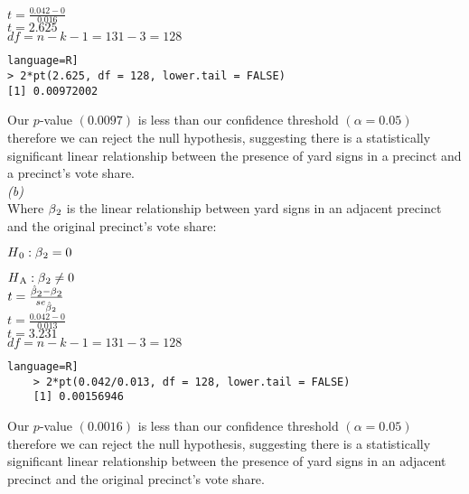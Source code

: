 \documentclass[12pt,letterpaper]{article}
\begin{document}
\noindent$t = \frac{0.042-0}{0.016}$\\

\noindent$t = 2.625$\\

\noindent$df = n-k-1 = 131-3 = 128$

\begin{lstlisting}language=R]
> 2*pt(2.625, df = 128, lower.tail = FALSE)
[1] 0.00972002
\end{lstlisting}

\noindent Our $p$-value $(0.0097)$ is less than our confidence threshold $(\alpha = 0.05)$ therefore we can reject the null hypothesis, suggesting there is a statistically significant linear relationship between the presence of yard signs in a precinct and a precinct's vote share.\\

\noindent\textit{(b)}\\

\noindent Where $\beta\textsubscript{2}$ is the linear relationship between yard signs in an adjacent precinct and the original precinct's vote share:

\noindent $H\textsubscript{0}: \beta\textsubscript{2} = 0$ 

\noindent $H\textsubscript{A}: \beta\textsubscript{2} \neq 0$ \\

\noindent $t =  \frac{\hat{\beta}\textsubscript{2} - \beta\textsubscript{2}}{se\textsubscript{$\hat{\beta}\textsubscript{2}$}}$\\

\noindent$t = \frac{0.042-0}{0.013}$\\

\noindent$t = 3.231$\\

\noindent$df = n-k-1 = 131-3 = 128$

\begin{lstlisting}language=R]
	> 2*pt(0.042/0.013, df = 128, lower.tail = FALSE)
	[1] 0.00156946
\end{lstlisting}

\noindent Our $p$-value $(0.0016)$ is less than our confidence threshold $(\alpha = 0.05)$ therefore we can reject the null hypothesis, suggesting there is a statistically significant linear relationship between the presence of yard signs in an adjacent precinct and the original precinct's vote share.\\

\clearpage
\end{document}
